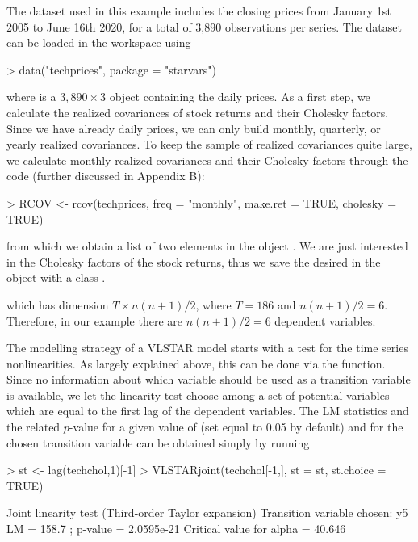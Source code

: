  The  dataset used in this example includes the closing prices from January 1st 2005 to June 16th 2020, for a total of 3,890 observations per series. The dataset can be loaded in the workspace using

%
\begin{example}
> data("techprices", package = "starvars")
\end{example}
%
where  is a $3,890 \times 3$  object containing the daily prices. As a first step, we calculate the realized covariances of stock returns and their Cholesky factors. Since we have already daily prices, we can only build monthly, quarterly, or yearly realized covariances. To keep the sample of realized covariances quite large, we calculate monthly realized covariances and their Cholesky factors through the code (further discussed in Appendix B):
%
\begin{example}
> RCOV <- rcov(techprices, freq = "monthly", make.ret = TRUE, cholesky = TRUE)
\end{example}
%
from which we obtain a list of two elements in the object . We are just interested in the Cholesky factors of the stock returns, thus we save the desired  in the object  with a class .
%
%
which has dimension $T \times n(n+1)/2$, where $T = 186$ and $n(n+1)/2 = 6$. Therefore, in our example there are $n(n+1)/2 = 6$ dependent variables.
		
The modelling strategy of a VLSTAR model starts with a test for the time series nonlinearities. As largely explained above, this can be done via the  function. Since no information about which variable should be used as a transition variable is available, we let the linearity test choose among a set of potential variables which are equal to the first lag of the dependent variables. The LM statistics and the related $p$-value for a given value of  (set equal to 0.05 by default) and for the chosen transition variable can be obtained simply by running
%
\begin{example}

> st <- lag(techchol,1)[-1]
> VLSTARjoint(techchol[-1,], st = st, st.choice = TRUE)

Joint linearity test (Third-order Taylor expansion)
Transition variable chosen: y5 
LM = 158.7 ; p-value = 2.0595e-21 
Critical value for alpha = 40.646

\end{example}
%	
		
